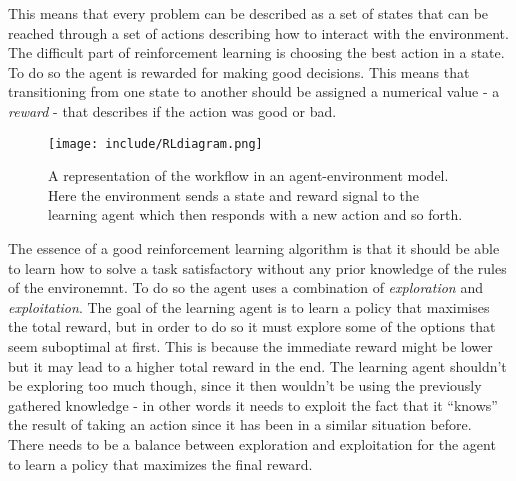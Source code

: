 \documentclass[11pt]{article}
\begin{document}
This means that every problem can be described as a set of states that can be reached
through a set of actions describing how to interact with the environment.
The difficult part of reinforcement learning is choosing the best action in a
state.
To do so the agent is rewarded for making good decisions.
This means that transitioning from one state to another should be assigned a numerical value
- a \textit{reward} - that describes if the action was good or bad.

\begin{figure}[!h]
    \centering
    \texttt{[image: include/RLdiagram.png]}
    \caption{A representation of the workflow in an agent-environment
    model. Here the environment sends a state and reward signal to the
    learning agent which then responds with a new action and so forth.}
    \label{fig:agent_enviroment}
\end{figure}

The essence of a good reinforcement learning algorithm is that it should be able to learn
how to solve a task satisfactory without any prior knowledge of the rules of the environemnt.
To do so the agent uses a combination of \textit{exploration} and \textit{exploitation}.
The goal of the learning agent is to learn a policy that maximises the total reward, but in order to do
so it must explore some of the options that seem suboptimal at first.
This is because the immediate reward might be lower but it may lead to a higher total reward in the end.
The learning agent shouldn't be exploring too much though, since it then wouldn't
be using the previously gathered knowledge - in other words it needs to
exploit the fact that it “knows” the result of taking an action since it has been in
a similar situation before.
There needs to be a balance between exploration and exploitation for the
agent to learn a policy that maximizes the final reward.
\end{document}
